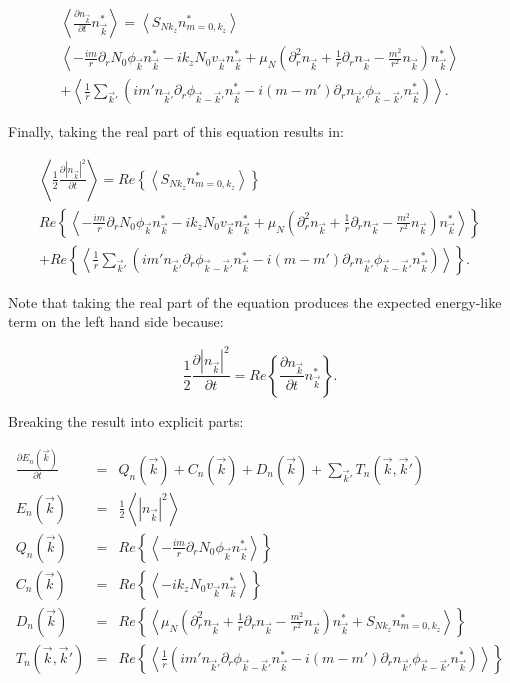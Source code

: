 \documentclass[showpacs,preprintnumbers,amsmath,amssymb,superscriptaddress]{revtex4}
\def\beq{\begin{equation}}
\def\eeq{\end{equation}}
\def\beqar{\begin{eqnarray}}
\def\eeqar{\end{eqnarray}}
\newcommand{\pdiff}[2]{\frac{\partial#1}{\partial#2}}
\newcommand{\pdr}{\partial_r}
\newcommand{\pdrr}{\partial^2_r}
\begin{document}
\beqar
\label{density_evolution}
\left< \pdiff{n_{\vec{k}}}{t} n_{\vec{k}}^* \right> = \left< S_{N k_z} n_{m=0,k_z}^* \right>  \nonumber \\
\left< -\frac{i m}{r} \pdr N_0 \phi_{\vec{k}} n_{\vec{k}}^* - i k_z N_0 v_{\vec{k}} n_{\vec{k}}^* + \mu_N( \pdrr n_{\vec{k}} + \frac{1}{r} \pdr n_{\vec{k}} - \frac{m^2}{r^2} n_{\vec{k}}) n_{\vec{k}}^*  \right> \nonumber \\
+ \left< \frac{1}{r} \sum_{\vec{k}'} \left( i m' n_{\vec{k}'} \pdr \phi_{\vec{k}-\vec{k}'} n_{\vec{k}}^*  - i (m - m') \pdr n_{\vec{k}'} \phi_{\vec{k}-\vec{k}'} n_{\vec{k}}^*        \right) \right>.
\eeqar

Finally, taking the real part of this equation results in:

\beqar
\label{real_density_evolution}
\left< \frac{1}{2} \pdiff{|n_{\vec{k}}|^2}{t} \right> = Re \left\{ \left< S_{N k_z} n_{m=0,k_z}^* \right> \right\} \nonumber \\
Re \left\{ \left< -\frac{i m}{r} \pdr N_0 \phi_{\vec{k}} n_{\vec{k}}^* - i k_z N_0 v_{\vec{k}} n_{\vec{k}}^* + \mu_N( \pdrr n_{\vec{k}} + \frac{1}{r} \pdr n_{\vec{k}} - \frac{m^2}{r^2} n_{\vec{k}}) n_{\vec{k}}^* \right> \right\} \nonumber \\
+ Re \left\{ \left< \frac{1}{r} \sum_{\vec{k}'} \left( i m' n_{\vec{k}'} \pdr \phi_{\vec{k}-\vec{k}'} n_{\vec{k}}^*  - i (m - m') \pdr n_{\vec{k}'} \phi_{\vec{k}-\vec{k}'} n_{\vec{k}}^*        \right) \right> \right\}.
\eeqar

Note that taking the real part of the equation produces the expected energy-like term on the left hand side because:

\beq
\frac{1}{2} \pdiff{|n_{\vec{k}}|^2}{t} = Re \left\{ \pdiff{n_{\vec{k}}}{t} n_{\vec{k}}^* \right\}.
\eeq

Breaking the result into explicit parts:

\beqar
\label{Fourier_density_evolution}
\pdiff{E_n(\vec{k})}{t} & = & Q_n(\vec{k}) + C_n(\vec{k}) + D_n(\vec{k}) + \sum_{\vec{k}'} T_n(\vec{k},\vec{k}') \\
E_n(\vec{k}) & = & \frac{1}{2} \left< |n_{\vec{k}}|^2 \right> \\
Q_n(\vec{k}) & = & Re \left\{ \left< -\frac{i m}{r} \pdr N_0 \phi_{\vec{k}} n_{\vec{k}}^* \right> \right\} \\
C_n(\vec{k}) & = & Re \left\{ \left< - i k_z N_0 v_{\vec{k}} n_{\vec{k}}^* \right> \right\} \\
D_n(\vec{k}) & = & Re \left\{ \left<  \mu_N( \pdrr n_{\vec{k}} + \frac{1}{r} \pdr n_{\vec{k}} - \frac{m^2}{r^2} n_{\vec{k}}) n_{\vec{k}}^*  + S_{N k_z} n_{m=0,k_z}^*  \right> \right\} \\
T_n(\vec{k},\vec{k}') & = & Re \left\{ \left< \frac{1}{r} \left( i m' n_{\vec{k}'} \pdr \phi_{\vec{k}-\vec{k}'} n_{\vec{k}}^*  - i (m - m') \pdr n_{\vec{k}'} \phi_{\vec{k}-\vec{k}'} n_{\vec{k}}^*        \right) \right> \right\}
\eeqar
\end{document}
